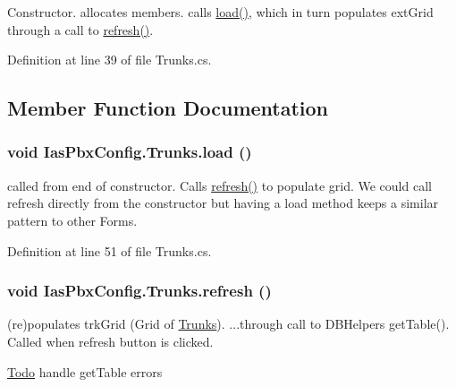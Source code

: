 Constructor. allocates members. calls \hyperlink{class_ias_pbx_config_1_1_trunks_ac6c14b9634426a42541b8fa28adfd6c9}{load()}, which in turn populates extGrid through a call to \hyperlink{class_ias_pbx_config_1_1_trunks_a6499b1bd73dbd347476a9e2df5538691}{refresh()}. 

Definition at line 39 of file Trunks.cs.

\subsection{Member Function Documentation}
\hypertarget{class_ias_pbx_config_1_1_trunks_ac6c14b9634426a42541b8fa28adfd6c9}{
\subsubsection[{load}]{\setlength{\rightskip}{0pt plus 5cm}void IasPbxConfig.Trunks.load ()}}
\label{class_ias_pbx_config_1_1_trunks_ac6c14b9634426a42541b8fa28adfd6c9}


called from end of constructor. Calls \hyperlink{class_ias_pbx_config_1_1_trunks_a6499b1bd73dbd347476a9e2df5538691}{refresh()} to populate grid. We could call refresh directly from the constructor but having a load method keeps a similar pattern to other Forms. 

Definition at line 51 of file Trunks.cs.\hypertarget{class_ias_pbx_config_1_1_trunks_a6499b1bd73dbd347476a9e2df5538691}{
\subsubsection[{refresh}]{\setlength{\rightskip}{0pt plus 5cm}void IasPbxConfig.Trunks.refresh ()}}
\label{class_ias_pbx_config_1_1_trunks_a6499b1bd73dbd347476a9e2df5538691}


(re)populates trkGrid (Grid of \hyperlink{class_ias_pbx_config_1_1_trunks}{Trunks}). ...through call to DBHelpers getTable(). Called when refresh button is clicked. \begin{Desc}
\item[\hyperlink{todo__todo000050}{Todo}]handle getTable errors \end{Desc}



